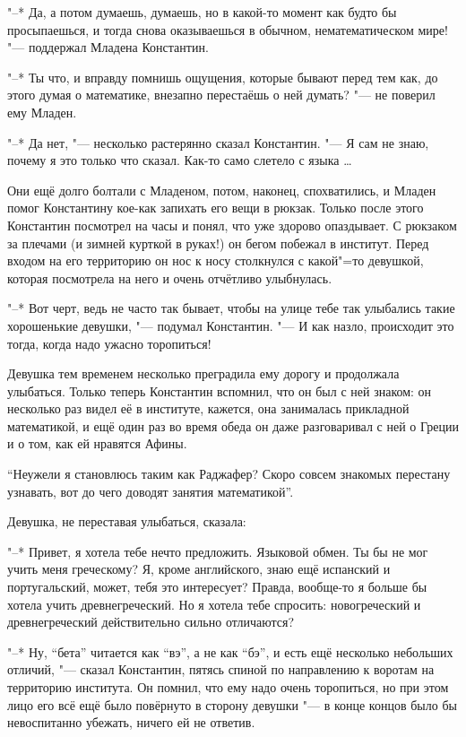 "--* Да, а потом думаешь, думаешь, но в какой-то момент как будто бы
просыпаешься, и тогда снова оказываешься в обычном, нематематическом мире!
"--- поддержал Младена Константин.

"--* Ты что, и вправду помнишь ощущения, которые бывают перед тем как, до этого
думая о математике, внезапно перестаёшь о ней думать? "--- не поверил ему Младен.

"--* Да нет, "--- несколько растерянно сказал Константин.
"--- Я сам не знаю, почему я это только что сказал.
Как-то само слетело с языка \ldots

Они ещё долго болтали с Младеном, потом, наконец, спохватились, и Младен помог
Константину кое-как запихать его вещи в рюкзак.
Только после этого Константин посмотрел на часы и понял, что уже здорово
опаздывает.
С рюкзаком за плечами (и зимней курткой в руках!) он бегом побежал в институт.
Перед входом на его территорию он нос к носу столкнулся с какой"=то девушкой,
которая посмотрела на него и очень отчётливо улыбнулась.

"--* Вот черт, ведь не часто так бывает, чтобы на улице тебе так улыбались
такие хорошенькие девушки, "--- подумал Константин.
"--- И как назло, происходит это тогда, когда надо ужасно торопиться!

Девушка тем временем несколько преградила ему дорогу и продолжала улыбаться.
Только теперь Константин вспомнил, что он был с ней знаком: он несколько раз
видел её в институте, кажется, она занималась прикладной математикой, и ещё один
раз во время обеда он даже разговаривал с ней о Греции и о том, как ей нравятся
Афины.

\enquote{Неужели я становлюсь таким как Раджафер?
Скоро совсем знакомых перестану узнавать, вот до чего доводят занятия
математикой}.

Девушка, не переставая улыбаться, сказала:

"--* Привет, я хотела тебе нечто предложить.
Языковой обмен.
Ты бы не мог учить меня греческому?
Я, кроме английского, знаю ещё испанский и португальский, может, тебя это
интересует?
Правда, вообще-то я больше бы хотела учить древнегреческий.
Но я хотела тебе спросить: новогреческий и древнегреческий действительно сильно
отличаются?

"--* Ну, \enquote{бета} читается как \enquote{вэ}, а не как \enquote{бэ}, и есть
ещё несколько небольших отличий, "--- сказал Константин, пятясь спиной по
направлению к воротам на территорию института.
Он помнил, что ему надо очень торопиться, но при этом лицо его всё ещё было
повёрнуто в сторону девушки "--- в конце концов было бы невоспитанно убежать,
ничего ей не ответив.

